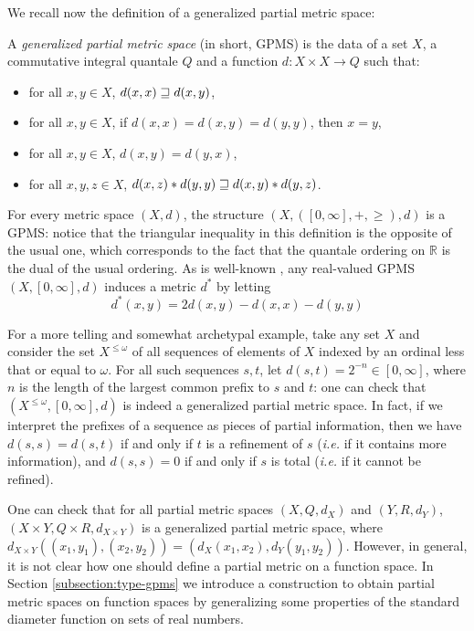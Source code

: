 We recall now the definition of a generalized partial metric space:


\begin{definition} A \emph{generalized partial metric space} (in short, GPMS) is the data of a set $X$, a commutative integral quantale $Q$ and a function $d : X \times X \to Q$ such that: \begin{itemize}
\item for all $x,y \in X$, $d(x,x) \sqsupseteq d(x,y)$,
\item for all $x,y \in X$, if $d(x,x) = d(x,y) = d(y,y)$, then $x = y$,
\item for all $x,y \in X$, $d(x,y) = d(y,x)$,
\item for all $x,y,z \in X$, $d(x,z) \mathbin{\ast} d(y,y) \sqsupseteq d(x,y) \mathbin{\ast} d(y,z)$.
\end{itemize}
\end{definition}

For every metric space $(X,d)$, the structure $(X, ([0,\infty], +, \geq), d)$ is a GPMS: notice that the triangular inequality in this definition is the opposite of the usual one, which corresponds to the fact that the quantale ordering on $\mathbb{R}$ is the dual of the usual ordering. 
As is well-known \cite{bkmp:partial-metrics}, any real-valued GPMS $(X,[0,\infty],d)$ induces a metric $d^{*}$ by letting 
\begin{equation}\label{eq:pmettomet} %
d^{*}(x,y)=2d(x,y)-d(x,x)-d(y,y)\tag{$\star$}
\end{equation}


For a more telling and somewhat archetypal example, take any set $X$ and consider the set $X^{\leq \omega}$ of all sequences of elements of $X$ indexed by an ordinal less that or equal to $\omega$. For all such sequences $s,t$, let $d(s,t) = 2^{-n} \in [0,\infty]$, where $n$ is the length of the largest common prefix to $s$ and $t$: one can check that $(X^{\leq \omega}, [0,\infty], d)$ is indeed a generalized partial metric space. In fact, if we interpret the prefixes of a sequence as pieces of partial information, then we have $d(s,s) = d(s,t)$ if and only if $t$ is a refinement of $s$ (\textit{i.e.} if it contains more information), and $d(s,s) = 0$ if and only if $s$ is total (\textit{i.e.} if it cannot be refined).

One can check that for all partial metric spaces $(X, Q, d_X)$ and $(Y, R, d_Y)$, $(X \times Y, Q \times R, d_{X \times Y})$ is a generalized partial metric space, where $d_{X \times Y}((x_1, y_1), (x_2, y_2)) = (d_X(x_1, x_2), d_Y(y_1, y_2))$. However, in general, it is not clear how one should define a partial metric on a function space. In  Section \ref{subsection:type-gpms} we introduce a construction to obtain partial metric spaces on function spaces by generalizing some properties of the standard diameter function on sets of real numbers.
